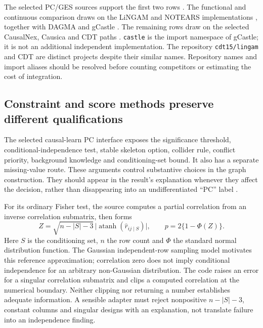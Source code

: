 The selected PC/GES sources support the first two rows
\citep{exec13_pydisc_causallearn,exec13_pydisc_pgmpy}.
The functional and continuous comparison draws on the LiNGAM and NOTEARS
implementations \citep{exec13_pydisc_lingam,exec13_pydisc_notears}, together
with DAGMA and gCastle \citep{exec13_pydisc_dagma,exec13_pydisc_gcastle}.
The remaining rows draw on the selected CausalNex, Causica and CDT paths
\citep{exec13_pydisc_causalnex,exec13_pydisc_causica,exec13_pydisc_cdt}.
\texttt{castle} is the import namespace of gCastle; it is not an additional
independent implementation. The repository \texttt{cdt15/lingam} and CDT are
distinct projects despite their similar names. Repository names and import
aliases should be resolved before counting competitors or estimating the
cost of integration.

\subsection{Constraint and score methods preserve different qualifications}

The selected causal-learn PC interface exposes the significance threshold,
conditional-independence test, stable skeleton option, collider rule, conflict
priority, background knowledge and conditioning-set bound. It also has a
separate missing-value route. These arguments control substantive choices in
the graph construction. They should appear in the result's explanation whenever
they affect the decision, rather than disappearing into an undifferentiated
``PC'' label \citep{exec13_pydisc_causallearn}.

For its ordinary Fisher test, the source computes a partial correlation from
an inverse correlation submatrix, then forms
\begin{equation}
 Z=\sqrt{n-|S|-3}\,\bigl|\operatorname{atanh}(\widehat r_{ij\mid S})\bigr|,
 \qquad p=2\{1-\Phi(Z)\}.
\end{equation}
Here \(S\) is the conditioning set, \(n\) the row count and \(\Phi\) the
standard normal distribution function. The Gaussian independent-row sampling
model motivates this reference approximation; correlation zero does not imply
conditional independence for an arbitrary non-Gaussian distribution. The code
raises an error for a singular correlation submatrix and clips a computed
correlation at the numerical boundary. Neither clipping nor returning a
number establishes adequate information. A sensible adapter must reject
nonpositive \(n-|S|-3\), constant columns and singular designs with an
explanation, not translate failure into an independence finding.


